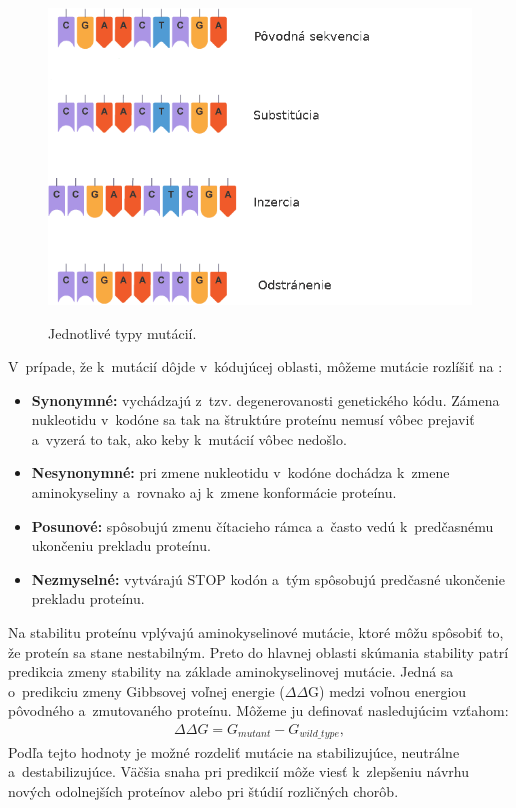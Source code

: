 \begin{figure}[H]
	\centering
	\begin{center}
		\scalebox{0.6}
		{   
			\includegraphics{mutation_types.png}
		}
		\caption[mutacie]{Jednotlivé typy mutácií\footnotemark.}
	\end{center}
\end{figure}

V~prípade, že k~mutácií dôjde v~kódujúcej oblasti, môžeme mutácie rozlíšiť na \cite{flegr}:
\begin{itemize}
	\item \textbf{Synonymné:} vychádzajú z~tzv. degenerovanosti genetického kódu. Zámena nukleotidu v~kodóne sa tak na štruktúre proteínu nemusí vôbec prejaviť a~vyzerá to tak, ako keby k~mutácií vôbec nedošlo. 
	\item \textbf{Nesynonymné:} pri zmene nukleotidu v~kodóne dochádza k~zmene aminokyseliny a~rovnako aj k~zmene konformácie proteínu.
	\item \textbf{Posunové:} spôsobujú zmenu čítacieho rámca a~často vedú k~predčasnému ukončeniu prekladu proteínu.
	\item \textbf{Nezmyselné:} vytvárajú STOP kodón a~tým spôsobujú predčasné ukončenie prekladu proteínu.
\end{itemize}
\newpage
Na stabilitu proteínu vplývajú aminokyselinové mutácie, ktoré môžu spôsobiť to, že proteín sa stane nestabilným. Preto do hlavnej oblasti skúmania stability patrí predikcia zmeny stability na základe aminokyselinovej mutácie. Jedná sa o~predikciu zmeny Gibbsovej voľnej energie ($\Delta\Delta$G) medzi voľnou energiou pôvodného a~zmutovaného proteínu. Môžeme ju definovať nasledujúcim vzťahom:
\begin{align}
	\Delta\Delta G = G_{mutant} - G_{wild\_type},
\end{align}
Podľa tejto hodnoty je možné rozdeliť mutácie na stabilizujúce, neutrálne a~destabilizujúce. Väčšia snaha pri predikcií môže viesť k~zlepšeniu návrhu nových odolnejších proteínov alebo pri štúdií rozličných chorôb.


